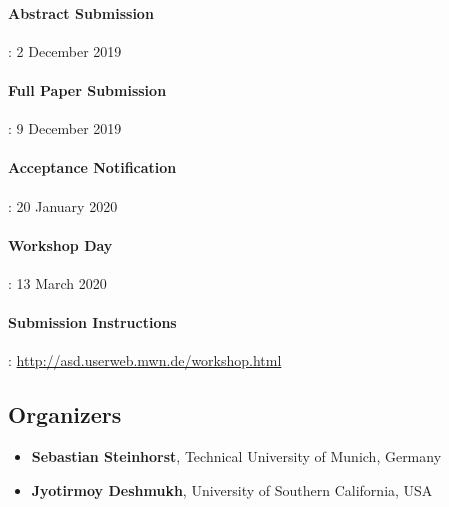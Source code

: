\documentclass[a4paper,10pt] {article}
\begin{document}
\paragraph{Abstract Submission}: 2 December 2019
\vspace{-0.5 cm}
\paragraph{Full Paper Submission}: 9 December 2019
\vspace{-0.5 cm}
\paragraph{Acceptance Notification}: 20 January 2020
\vspace{-0.5 cm}
\paragraph{Workshop Day}: 13 March 2020
\vspace{-0.5 cm}
\paragraph{Submission Instructions}: \href{http://asd.userweb.mwn.de/workshop.html}{http://asd.userweb.mwn.de/workshop.html} 
\subsection*{Organizers}
\begin{itemize}[noitemsep]
\item \textbf{Sebastian Steinhorst}, Technical University of Munich, Germany %
\item \textbf{Jyotirmoy Deshmukh}, University of Southern California, USA  \end{itemize}
\end{document}
